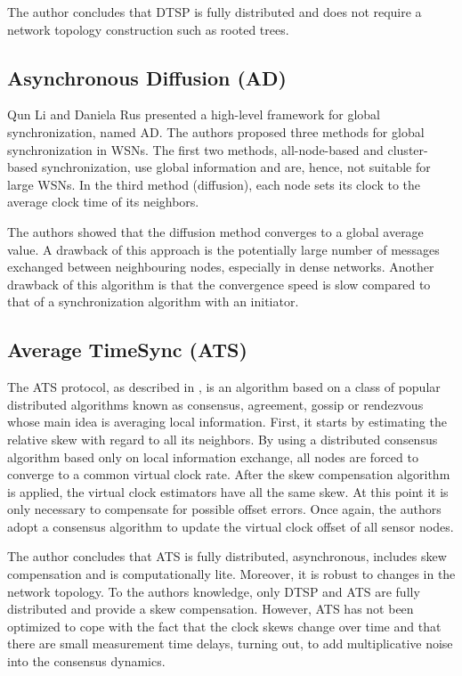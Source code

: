 The author concludes that DTSP is fully distributed and does not require a network topology construction such as rooted trees.

\subsection{Asynchronous Diffusion (AD)}
Qun Li and Daniela Rus \cite{conf/infocom/LiR04} presented a high-level framework for global synchronization, named \ac{AD}. The authors proposed three methods for global synchronization in WSNs. The first two methods, all-node-based and cluster-based synchronization, use global information and are, hence, not suitable for large WSNs. In the third method (diffusion), each node sets its clock to the average clock time of its neighbors.

The authors showed that the diffusion method converges to a global average value. A drawback of this approach is the
potentially large number of messages exchanged between neighbouring nodes, especially in dense networks. Another drawback of this algorithm is that the convergence speed is slow compared to that of a synchronization algorithm with an initiator.

\subsection{Average TimeSync (ATS)}
The \ac{ATS} protocol, as described in \cite{schenato07}, is an algorithm based on a class of popular distributed algorithms known as consensus, agreement, gossip or rendezvous whose main idea is averaging local information. First, it starts by estimating the relative skew with regard to all its neighbors. By using a  distributed  consensus algorithm based only on local information  exchange, all nodes are forced to converge to a common virtual clock rate.
After the skew compensation algorithm is applied, the virtual clock estimators have all the same skew. At this point it is
only necessary to compensate for possible offset errors. Once again, the authors adopt a consensus algorithm to update the virtual clock offset of all sensor nodes.

The author concludes that ATS is fully distributed, asynchronous, includes skew compensation and is computationally lite. Moreover, it is robust to changes in the network topology. To the authors knowledge, only DTSP and ATS are fully distributed and provide a skew compensation. However, ATS has not been optimized to cope with the fact that the clock skews change over time and that there are small measurement time delays, turning out, to add multiplicative noise into the consensus dynamics.

